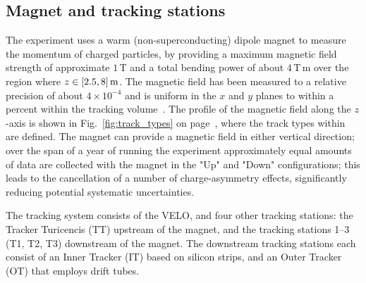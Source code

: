 \subsection{Magnet and tracking stations} %
\label{sub:magnet_and_tracking_stations}

The \lhcb experiment uses a warm (non-superconducting) dipole magnet to measure the momentum of charged particles, by providing a maximum magnetic field strength of approximate $1$\,T and a total bending power of about $4\,$T\,m over the region where $z\in[2.5, 8]\text{\,m}$. The magnetic field has been measured to a relative precision of about $4\times 10^{-4}$ and is uniform in the $x$ and $y$ planes to within a percent within the tracking volume~\cite{LHCb-detector}. The profile of the magnetic field along the $z$-axis is shown in Fig.~\ref{fig:track_types} on page~\pageref{fig:track_types}, where the track types within \lhcb are defined. The magnet can provide a magnetic field in either vertical direction; over the span of a year of running the experiment approximately equal amounts of data are collected with the magnet in the "Up" and "Down" configurations; this leads to the cancellation of a number of charge-asymmetry effects, significantly reducing potential systematic uncertainties. 

The tracking system consists of the VELO, and four other tracking stations: the Tracker Turicencis (TT) upstream of the magnet, and the tracking stations 1--3 (T1, T2, T3) downstream of the magnet. The downstream tracking stations each consist of an Inner Tracker (IT) based on silicon strips, and an Outer Tracker (OT) that employs drift tubes. 

